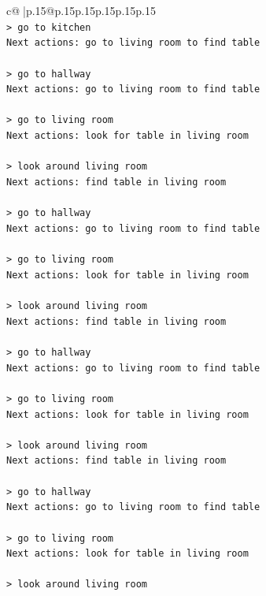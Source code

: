 \documentclass{article}
\begin{document}
{\begin{supertabular}{c@{$\;$}|p{.15\linewidth}@{}p{.15\linewidth}p{.15\linewidth}p{.15\linewidth}p{.15\linewidth}p{.15\linewidth}}
{{{\\ 
\texttt{> go to kitchen} \\
\texttt{Next actions: go to living room to find table} \\
\\ 
\texttt{> go to hallway} \\
\texttt{Next actions: go to living room to find table} \\
\\ 
\texttt{> go to living room} \\
\texttt{Next actions: look for table in living room} \\
\\ 
\texttt{> look around living room} \\
\texttt{Next actions: find table in living room} \\
\\ 
\texttt{> go to hallway} \\
\texttt{Next actions: go to living room to find table} \\
\\ 
\texttt{> go to living room} \\
\texttt{Next actions: look for table in living room} \\
\\ 
\texttt{> look around living room} \\
\texttt{Next actions: find table in living room} \\
\\ 
\texttt{> go to hallway} \\
\texttt{Next actions: go to living room to find table} \\
\\ 
\texttt{> go to living room} \\
\texttt{Next actions: look for table in living room} \\
\\ 
\texttt{> look around living room} \\
\texttt{Next actions: find table in living room} \\
\\ 
\texttt{> go to hallway} \\
\texttt{Next actions: go to living room to find table} \\
\\ 
\texttt{> go to living room} \\
\texttt{Next actions: look for table in living room} \\
\\ 
\texttt{> look around living room} \\
}}}
\end{supertabular}}
\end{document}
